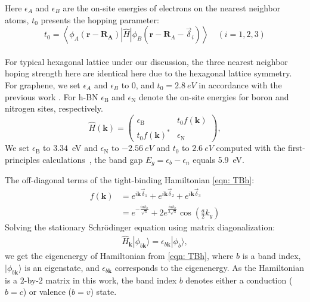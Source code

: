 Here $\epsilon_{A}$ and $\epsilon_{B}$ are the on-site energies of electrons on the nearest neighbor atoms, $t_0$ presents the hopping parameter:
$$
	t_{0}=\left\langle\phi_{A}\left(\mathbf{r}-\mathbf{R}_{\mathbf{A}}\right)|\hat{H}| \phi_{B}\left(\mathbf{r}-\mathbf{R}_{A}-\vec{\delta}_{i}\right)\right\rangle \quad(i=1,2,3)
$$\\
For typical hexagonal lattice under our discussion, the three nearest neighbor hoping strength here are identical here due to the hexagonal lattice symmetry. For graphene, we set $\epsilon_{A}$ and $\epsilon_{B}$ to 0, and $t_0=2.8~eV$ in accordance with the previous work  \cite{sarma2011electronic}. For h-BN $\epsilon_{\mathrm{B}}$ and $\epsilon_{\mathrm{N}}$ denote the on-site energies for boron and nitrogen sites, respectively.
\begin{equation}
	\hat{H}(\mathbf{k})=\left(\begin{array}{cc}
			\epsilon_{\mathrm{B}}   & t_{0} f(\mathbf{k})   \\
			t_{0} f(\mathbf{k})^{*} & \epsilon_{\mathrm{N}}
		\end{array}\right),
	\label{eqn:hBNhamiltonian}
\end{equation}
We set $\epsilon_{\mathrm{B}}$ to $3.34$~eV and $\epsilon_{\mathrm{N}}$ to $-2.56~eV$ and $t_0$ to $2.6~eV$ computed with the first-principles calculations~\cite{PhysRevB.51.6868}, the band gap $E_{g}=\epsilon_{b}-\epsilon_{n}$ equals 5.9~eV.

The off-diagonal terms of the tight-binding Hamiltonian \ref{eqn: TBh}:
\begin{equation}
	\begin{aligned}
		f(\mathbf{k}) & =e^{i \mathbf{k} \vec{\delta}_{1}}+e^{i \mathbf{k} \vec{\delta}_{2}}+e^{i \mathbf{k} \vec{\delta}_{3}}  \\
		              & =e^{-\frac{i a k_{x}}{\sqrt{3}}}+2 e^{\frac{i a k_{x}}{2 \sqrt{3}}} \cos \left(\frac{a}{2} k_{y}\right)
	\end{aligned}
	\label{eqn:nearest_h}
\end{equation}
Solving the stationary Schrödinger equation using matrix diagonalization:
\begin{align}
	\hat{H}_{\mathbf{k}}|\phi_{b \mathbf{k}}\rangle = \epsilon_{b\mathbf{k}}|\phi_{b}\rangle,
	\label{eq:eqigenstates-h0}
\end{align}
we get the eigenenergy of Hamiltonian from \ref{eqn: TBh}, where $b$ is a band index, $|\phi_{b\mathbf{k}}\rangle$ is an eigenstate, and $\epsilon_{b\mathbf{k}}$ corresponds to the eigenenergy. As the Hamiltonian is a $2$-by-$2$ matrix in this work, the band index $b$ denotes either a conduction ($b=c$) or valence ($b=v$) state.

